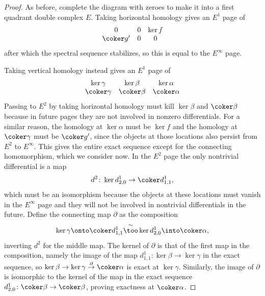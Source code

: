 \documentclass[10pt]{article}
\begin{document}
\begin{proof}
    As before, complete the diagram with zeroes
    to make it into a first quadrant double complex $E$.
    Taking horizontal homology gives an $E^1$ page of
    \begin{equation*}
        \begin{matrix}
	    0 & 0 & \ker f\\
	    \coker g' & 0 & 0
        \end{matrix}
    \end{equation*}
    after which the spectral sequence stabilizes,
    so this is equal to the $E^\infty$ page.

    Taking vertical homology instead gives an $E^1$ page of
    \begin{equation*}
        \begin{matrix}
	    \ker\gamma & \ker\beta & \ker\alpha\\
	    \coker\gamma & \coker\beta & \coker\alpha
        \end{matrix}
    \end{equation*}
    Passing to $E^2$ by taking horizontal homology
    must kill $\ker\beta$ and $\coker\beta$
    because in future pages they are not involved in nonzero differentials.
    For a similar reason, the homology at $\ker\alpha$ must be $\ker f$
    and the homology at $\coker\gamma$ must be $\coker g'$,
    since the objects at those locations
    also persist from $E^2$ to $E^\infty$.
    This gives the entire exact sequence
    except for the connecting homomorphism, which we consider now.
    In the $E^2$ page the only nontrivial differential is a map
    \begin{equation*}
	d^2 \colon \ker d^1_{2,0} \to \coker d^1_{1,1},
    \end{equation*}
    which must be an isomorphism because the objects at these locations
    must vanish in the $E^\infty$ page and they will not be
    involved in nontrivial differentials in the future.
    Define the connecting map $\partial$ as the composition
    \begin{equation*}
	\ker\gamma\onto\coker d^1_{1,1}
	\overset\sim\too\ker d^1_{2,0}\into\coker\alpha,
    \end{equation*}
    inverting $d^2$ for the middle map.
    The kernel of $\partial$ is that of the first map in the composition,
    namely the image of the map $d^1_{1,1}\colon\ker\beta\to\ker\gamma$
    in the exact sequence, so
    $\ker\beta\to\ker\gamma\overset\partial\to\coker\alpha$
    is exact at $\ker\gamma$.
    Similarly, the image of $\partial$ is isomorphic to the kernel of the map
    in the exact sequence $d^1_{2,0}\colon\coker\beta\to\coker\beta$,
    proving exactness at $\coker\alpha$.
\end{proof}
\end{document}
